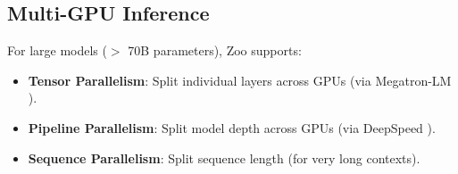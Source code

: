 \subsection{Multi-GPU Inference}

For large models ($>$ 70B parameters), Zoo supports:
\begin{itemize}
\item \textbf{Tensor Parallelism}: Split individual layers across GPUs (via Megatron-LM \cite{shoeybi2019megatron}).
\item \textbf{Pipeline Parallelism}: Split model depth across GPUs (via DeepSpeed \cite{rasley2020deepspeed}).
\item \textbf{Sequence Parallelism}: Split sequence length (for very long contexts).
\end{itemize}


